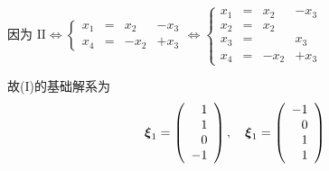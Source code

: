 \begin{frame}
  \begin{footnotesize}
    因为
      $
      \mbox{II} \Longleftrightarrow
      \left\{
      \begin{array}{rcrr}
        x_1&=&x_2&-x_3\\[0.05in]
        x_4&=&-x_2&+x_3
      \end{array}
      \right. \Longleftrightarrow
      \left\{
      \begin{array}{rcrr}
        x_1&=&x_2&-x_3\\[0.05in]
        x_2&=&x_2&\\[0.05in]
        x_3&=&&x_3\\[0.05in]
        x_4&=&-x_2&+x_3
      \end{array}
      \right. 
      $\pause 
      
      故(I)的基础解系为
      $$
      \boldsymbol{\xi}_1=\left(
      \begin{array}{r}
        1\\1\\0\\-1
      \end{array}
      \right), \quad
      \boldsymbol{\xi}_1=\left(
      \begin{array}{r}
        -1\\0\\1\\1
      \end{array}
      \right)
      $$
  \end{footnotesize}
\end{frame}

